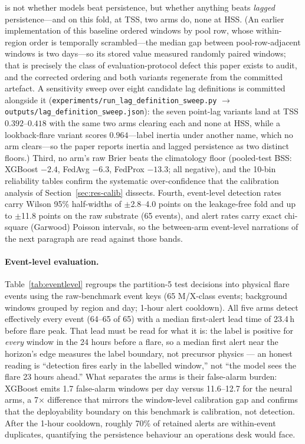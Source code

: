 is not whether models beat persistence, but whether anything beats
\emph{lagged} persistence---and on this fold, at TSS, two arms do,
none at HSS. (An
earlier implementation of this baseline ordered windows by pool row,
whose within-region order is temporally scrambled---the median gap
between pool-row-adjacent windows is two days---so its stored value
measured randomly paired windows; that is precisely the class of
evaluation-protocol defect this paper exists to audit, and the
corrected ordering and both variants regenerate from the committed
artefact. A sensitivity sweep over eight candidate lag definitions
is committed alongside it
(\texttt{experiments/run\_lag\_definition\_sweep.py} $\to$
\texttt{outputs/lag\_definition\_sweep.json}): the seven point-lag
variants land at TSS $0.392$--$0.418$ with the same two arms
clearing each and none at HSS, while a lookback-flare variant
scores $0.964$---label inertia under another name, which no arm
clears---so the paper reports inertia and lagged persistence as
two distinct floors.) Third, no arm's raw Brier beats the climatology floor
(pooled-test BSS: XGBoost $-2.4$, FedAvg $-6.3$, FedProx $-13.3$;
all negative), and the 10-bin reliability tables confirm the
systematic over-confidence that the calibration analysis of
Section~\ref{sec:res-calib} dissects. Fourth, event-level detection
rates carry Wilson 95\% half-widths of $\pm$2.8--4.0 points on the
leakage-free fold and up to $\pm$11.8 points on the raw substrate
(65 events), and alert rates carry exact chi-square (Garwood)
Poisson intervals, so the between-arm event-level narrations of the
next paragraph are read against those bands.

\paragraph{Event-level evaluation.}
Table~\ref{tab:eventlevel} regroups the partition-5 test decisions
into physical flare events using the raw-benchmark event keys (65
M/X-class events; background windows grouped by region and day;
1-hour alert cooldown). All five arms detect effectively every event
(64--65 of 65) with a median first-alert lead time of 23.4\,h before
flare peak. That lead must be read for what it is: the label is
positive for \emph{every} window in the 24 hours before a flare, so a
median first alert near the horizon's edge measures the label
boundary, not precursor physics --- an honest reading is ``detection
fires early in the labelled window,'' not ``the model sees the flare
23 hours ahead.'' What separates the arms is their false-alarm
burden: XGBoost emits 1.7
false-alarm windows per day versus 11.6--12.7 for the neural arms, a
7$\times$ difference that mirrors the window-level calibration gap
and confirms that the deployability boundary on this benchmark is
calibration, not detection. After the 1-hour cooldown, roughly 70\%
of retained alerts are within-event duplicates, quantifying the
persistence behaviour an operations desk would face.

